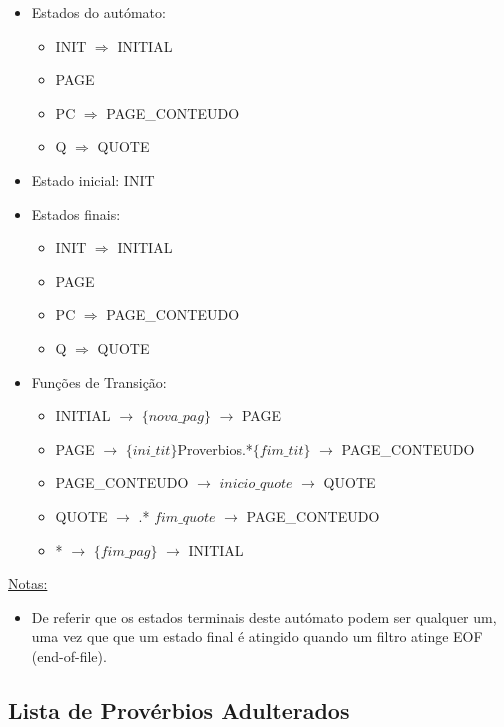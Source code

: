 \documentclass[11pt,a4paper]{report}
\begin{document}
\begin{itemize}
	\item Estados do autómato:
		\begin{itemize}
			\item INIT $\Rightarrow$ INITIAL
			\item PAGE
			\item PC $\Rightarrow$ PAGE\_CONTEUDO
			\item Q $\Rightarrow$ QUOTE
		\end{itemize}
	\item Estado inicial: INIT
	\item Estados finais:
		\begin{itemize}
			\item INIT $\Rightarrow$ INITIAL
			\item PAGE
			\item PC $\Rightarrow$ PAGE\_CONTEUDO
			\item Q $\Rightarrow$ QUOTE
		\end{itemize}
	\item Funções de Transição:
		\begin{itemize}
			\item INITIAL $\rightarrow$ $\{nova\_pag\}$ $\rightarrow$ PAGE
			\item PAGE $\rightarrow$ $\{ini\_tit\}$Proverbios.*$\{fim\_tit\}$ $\rightarrow$ PAGE\_CONTEUDO
			\item PAGE\_CONTEUDO $\rightarrow$ $inicio\_quote$ $\rightarrow$ QUOTE
			\item QUOTE $\rightarrow$ .* $fim\_quote$ $\rightarrow$ PAGE\_CONTEUDO
			\item * $\rightarrow$ $\{fim\_pag\}$ $\rightarrow$ INITIAL
		\end{itemize}
\end{itemize}

\vspace{0.5cm}
	
\underline{Notas:}
\begin{itemize}
	\item De referir que os estados terminais deste autómato podem ser qualquer um, uma vez que que um estado final é atingido quando um filtro atinge EOF (end-of-file).
\end{itemize}



\newpage

\subsection{Lista de Provérbios Adulterados}
\label{sub:algoritmos3}
\end{document}
